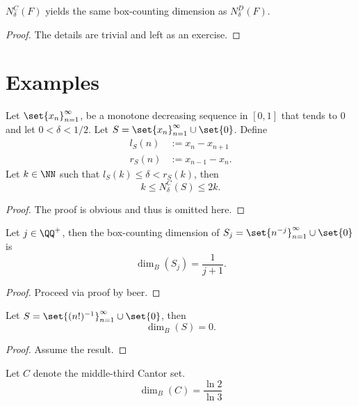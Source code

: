 \begin{thm}
	$N^C_\delta(F)$ yields the same box-counting dimension as $N^D_\delta(F)$.
\end{thm}
\begin{proof}
	The details are trivial and left as an exercise.
\end{proof}

\section{Examples}

\begin{lemma}
	Let $\set{x_n}_{n=1}^\infty$, be a monotone decreasing sequence in $[0,1]$ that tends to 0 and let $0 < \delta < 1/2$.
	Let $S=\set{x_n}_{n=1}^\infty\cup\set{0}$.
	Define
	\begin{align*}
		l_S(n)&:= x_n-x_{n+1}\\
		r_S(n)&:= x_{n-1}-x_n.
	\end{align*}
	Let $k\in\NN$ such that $l_S(k)\leq \delta < r_S(k)$, then
	\[
		k \leq N^C_\delta(S)\leq 2k.
	\]
\end{lemma}
\begin{proof}
	The proof is obvious and thus is omitted here.
\end{proof}

\begin{example}
	Let $j\in\QQ^+$, then the box-counting dimension of $S_j=\set{n^{-j}}_{n=1}^\infty\cup\set{0}$ is
	\[
		\dim_B(S_j)=\frac{1}{j+1}.
	\]
\end{example}
\begin{proof}
	Proceed via proof by beer.
\end{proof}

\begin{example}
	Let $S=\set{(n!)^{-1}}_{n=1}^\infty\cup\set{0}$, then
	\[
		\dim_B(S)=0.
	\]
\end{example}
\begin{proof}
	Assume the result.
\end{proof}

\begin{example}
	Let $C$ denote the middle-third Cantor set.
	\[
		\dim_B(C)=\frac{\ln2}{\ln3}
	\]
\end{example}

